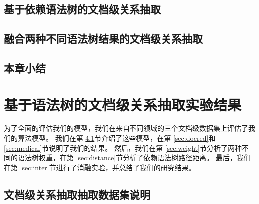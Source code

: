 \documentclass[bachelor]{thesis-uestc}
\begin{document}
\section{基于依赖语法树的文档级关系抽取}

\section{融合两种不同语法树结果的文档级关系抽取}

\section{本章小结}
\newpage


\chapter{基于语法树的文档级关系抽取实验结果}
为了全面的评估我们的模型，我们在来自不同领域的三个文档级数据集上评估了我们的算法模型。
我们在第 \ref{sec:dataset}节介绍了这些模型，在第 \ref{sec:docred}和 \ref{sec:medical}节说明了我们的结果。
然后，我们在第 \ref{sec:weight}节分析了两种不同的语法树权重，在第 \ref{sec:distance}节分析了依赖语法树路径距离。
最后，我们在第 \ref{sec:inter}节进行了消融实验，并总结了我们的研究结果。

\section{文档级关系抽取抽取数据集说明}\label{sec:dataset}
\end{document}
